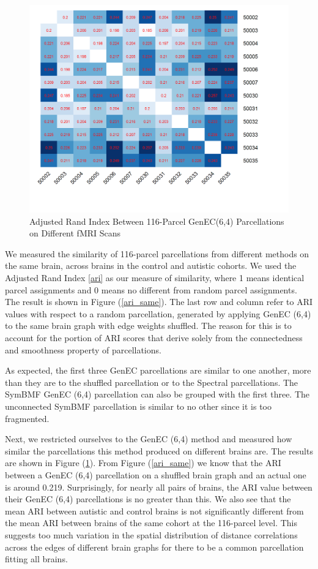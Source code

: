 \begin{figure}
\caption{Adjusted Rand Index Between 116-Parcel GenEC(6,4)
Parcellations on Different fMRI Scans}
\label{ari_diff}
\includegraphics[scale = 1]{figs/8_ari_diff.png}
\end{figure}

We measured the similarity of 116-parcel parcellations from different
methods on the same brain, across brains in the control and autistic
cohorts. We used the Adjusted Rand Index \ref{ari} as our measure of
similarity, where 1 means identical parcel assignments and 0 means no
different from random parcel assignments. The result is shown in Figure
(\ref{ari_same}). The last row and column refer to ARI values with
respect to a random parcellation, generated by applying GenEC (6,4) to
the same brain graph with edge weights shuffled. The reason for this is
to account for the portion of ARI scores that derive solely from the
connectedness and smoothness property of parcellations.

As expected, the first three GenEC parcellations are similar to one
another, more than they are to the shuffled parcellation or to the
Spectral parcellations. The SymBMF GenEC (6,4) parcellation can also be
grouped with the first three. The unconnected SymBMF parcellation is
similar to no other since it is too fragmented.

Next, we restricted ourselves to the GenEC (6,4) method and measured
how similar the parcellations this method produced on different brains
are. The results are shown in Figure (\ref{ari_diff}). From Figure
(\ref{ari_same}) we know that the ARI between a GenEC (6,4) parcellation
on a shuffled brain graph and an actual one is around 0.219.
Surprisingly, for nearly all pairs of brains, the ARI value between
their GenEC (6,4) parcellations is no greater than this. We also see
that the mean ARI between autistic and control brains is not
significantly different from the mean ARI between brains of the same
cohort at the 116-parcel level. This suggests too much variation in the
spatial distribution of distance correlations across the edges of
different brain graphs for there to be a common parcellation fitting
all brains.

